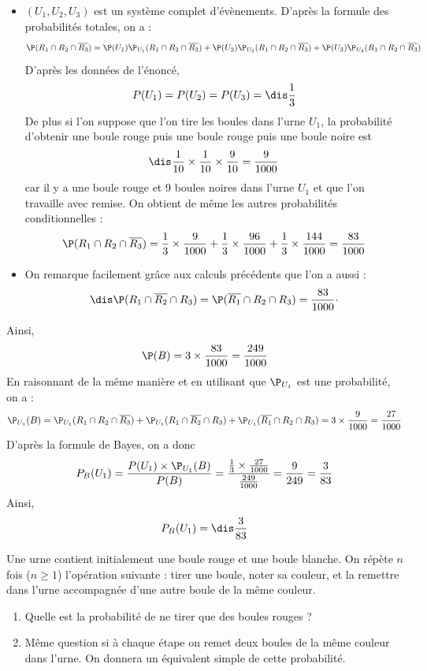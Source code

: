 \documentclass[a4paper,10pt]{report}
\begin{document}
\begin{itemize}
\item $(U_1,U_2,U_3)$ est un système complet d'évènements. D'après la formule des probabilités totales, on a : 
\[ \P( R_1 \cap R_2 \cap \overline{R_3}) = \P(U_1) \P_{U_1}( R_1 \cap R_2 \cap \overline{R_3}) + \P(U_2) \P_{U_2}( R_1 \cap R_2 \cap \overline{R_3}) + \P(U_3) \P_{U_3}( R_1 \cap R_2 \cap \overline{R_3}) \]
D'après les données de l'énoncé, 
$$P(U_1)= P(U_2)= P(U_3)= \dis \frac{1}{3}$$
De plus si l'on suppose que l'on tire les boules dans l'urne $U_1$, la probabilité d'obtenir une boule rouge puis une boule rouge puis une boule noire est 
$$\dis \frac{1}{10} \times \frac{1}{10} \times \frac{9}{10} = \frac{9}{1000}$$ car il y a une boule rouge et 9 boules noires dans l'urne $U_1$ et que l'on travaille avec remise. On obtient de même les autres probabilités conditionnelles :
\[ \P( R_1 \cap R_2 \cap \overline{R_3}) = \frac{1}{3} \times \frac{9}{1000} + \frac{1}{3} \times \frac{96}{1000} + \frac{1}{3} \times \frac{144}{1000} = \frac{83}{1000} \]
\item On remarque facilement grâce aux calculs précédents que l'on a aussi :
$$\dis \P(R_1 \cap \overline{R_2} \cap R_3) = \P(\overline{R_1} \cap R_2 \cap R_3) = \frac{83}{1000} \cdot$$
\end{itemize}
Ainsi, 
$$ \P(B) = 3 \times \frac{83}{1000} = \frac{249}{1000}$$
En raisonnant de la même manière et en utilisant que $\P_{U_1}$ est une probabilité, on a :
\[ \P_{U_1}(B) =  \P_{U_1}(R_1 \cap R_2 \cap \overline{R_3}) + \P_{U_1}(R_1 \cap \overline{R_2} \cap R_3) + \P_{U_1} (\overline{R_1} \cap R_2 \cap R_3) = 3 \times \frac{9}{1000} = \frac{27}{1000} \]
D'après la formule de Bayes, on a donc 
\[ P_{B}(U_1) = \frac{P(U_1) \times \P_{U_1}(B) }{P(B)} = \frac{\frac{1}{3} \times \frac{27}{1000}}{\frac{249}{1000}} = \frac{9}{249} = \frac{3}{83} \]
Ainsi,
$$ P_{B}(U_1) = \dis \frac{3}{83} $$

\begin{Exa} Une urne contient initialement une boule rouge et une boule blanche. On répète $n$ fois ($n \geq 1$) l'opération suivante : tirer une boule, noter sa couleur, et la remettre dans l'urne accompagnée d'une autre boule de la même couleur. 

\begin{enumerate}
\item Quelle est la probabilité de ne tirer que des boules rouges ?
\item Même question si à chaque étape on remet deux boules de la même couleur dans l'urne. On donnera un équivalent simple de cette probabilité.
\end{enumerate}
\end{Exa} 
\end{document}
